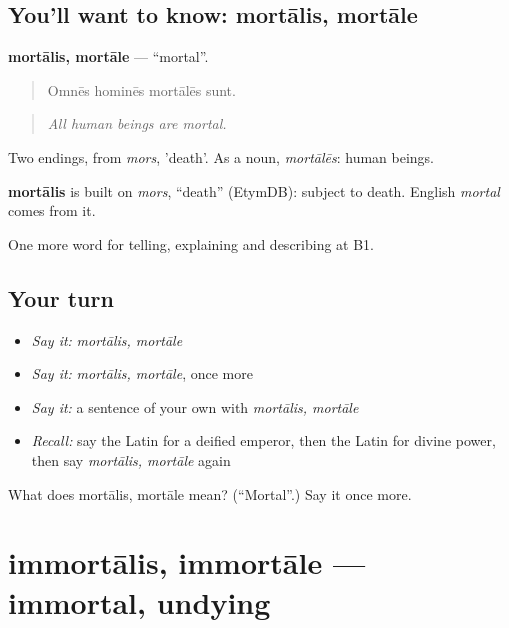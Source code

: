 \subsection*{You'll want to know: mortālis, mortāle}
\textbf{mortālis, mortāle} — \textquotedblleft{}mortal\textquotedblright{}.

\begin{quote}
Omnēs hominēs mortālēs sunt.
\end{quote}

\begin{quote}
\emph{All human beings are mortal.}
\end{quote}

Two endings, from \emph{mors}, 'death'. As a noun, \emph{mortālēs}: human beings.

\begin{cousinweb}
\textbf{mortālis} is built on \emph{mors}, \textquotedblleft{}death\textquotedblright{} (EtymDB): subject to death. English \emph{mortal} comes from it.
\end{cousinweb}

\begin{grammarlens}[title={What you've built}]
One more word for telling, explaining and describing at B1.
\end{grammarlens}

\subsection*{Your turn}
\begin{itemize}
\raggedright
  \item \emph{Say it:} \emph{mortālis, mortāle}
  \item \emph{Say it:} \emph{mortālis, mortāle}, once more
  \item \emph{Say it:} a sentence of your own with \emph{mortālis, mortāle}
  \item \emph{Recall:} say the Latin for a deified emperor, then the Latin for divine power, then say \emph{mortālis, mortāle} again
\end{itemize}

\begin{tcolorbox}[breakable,colback=teal!4,colframe=teal!35!black,title={Before you move on}]
What does mortālis, mortāle mean? (\textquotedblleft{}Mortal\textquotedblright{}.) Say it once more.
\end{tcolorbox}
\section[immortālis, immortāle]{immortālis, immortāle — immortal, undying}


